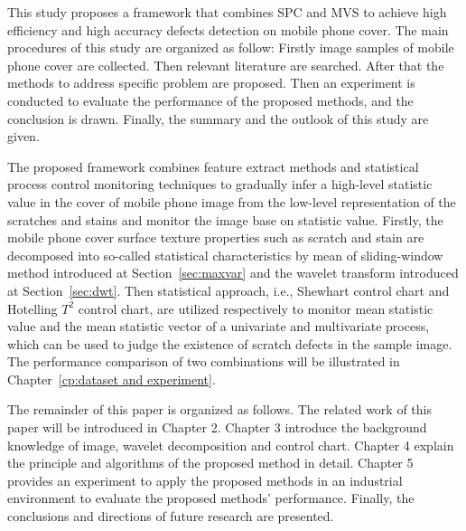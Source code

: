 This study proposes a framework that combines SPC and MVS to achieve high efficiency and high accuracy defects detection on mobile phone cover. The main procedures of this study are organized as follow: Firstly image samples of mobile phone cover are collected. Then relevant literature are searched. After that the methods to address specific problem are proposed. Then an experiment is conducted to evaluate the performance of the proposed methods, and the conclusion is drawn. Finally, the summary and the outlook of this study are given.

\begin{comment}
\begin{itemize}
    \item samples collect
    \item relative paper review
    \item methods propose
    \item experiments conduct and compare
    \item result analyze and improve
\end{itemize}
\end{comment}



The proposed framework combines feature extract methods and statistical process control monitoring techniques to gradually infer a high-level statistic value in the cover of mobile phone image from the low-level representation of the scratches and stains and monitor the image base on statistic value. Firstly, the mobile phone cover surface texture properties such as scratch and stain are decomposed into so-called statistical characteristics by mean of sliding-window method introduced at Section~\ref{sec:maxvar} and the wavelet transform introduced at Section~\ref{sec:dwt}. Then statistical approach, i.e., Shewhart control chart and Hotelling $T^{2}$ control chart, are utilized respectively to monitor mean statistic value and the mean statistic vector of a univariate and multivariate process, which can be used to judge the existence of scratch defects in the sample image. The performance comparison of two combinations will be illustrated in Chapter~\ref{cp:dataset and experiment}.


The remainder of this paper is organized as follows. The
related work of this paper will be
introduced in Chapter 2. Chapter 3 introduce the background knowledge of image, wavelet decomposition and control chart.
Chapter 4 explain the principle and algorithms of the proposed method in detail. Chapter 5 provides an experiment to apply the proposed methods in an industrial environment to evaluate the proposed methods' performance. Finally, the conclusions and directions of future research are presented.